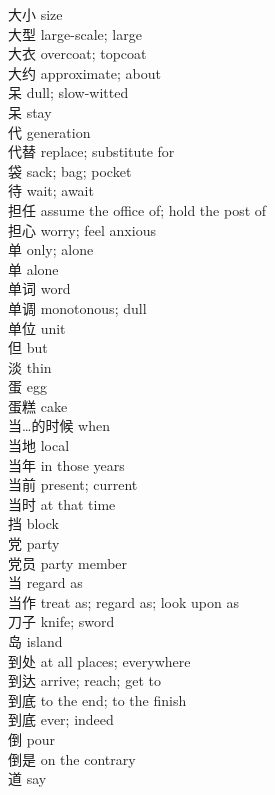 大小 \quad size\\
大型 \quad large-scale; large\\
大衣 \quad overcoat; topcoat\\
大约 \quad approximate; about\\
呆 \quad dull; slow-witted\\
呆 \quad stay\\
代 \quad generation\\
代替 \quad replace; substitute for\\
袋 \quad sack; bag; pocket\\
待 \quad wait; await\\
担任 \quad assume the office of; hold the post of\\
担心 \quad worry; feel anxious\\
单 \quad only; alone\\
单 \quad alone\\
单词 \quad word\\
单调 \quad monotonous; dull\\
单位 \quad unit\\
但 \quad but\\
淡 \quad thin\\
蛋 \quad egg\\
蛋糕 \quad cake\\
当…的时候 \quad when\\
当地 \quad local\\
当年 \quad in those years\\
当前 \quad present; current\\
当时 \quad at that time\\
挡 \quad block\\
党 \quad party\\
党员 \quad party member\\
当 \quad regard as\\
当作 \quad treat as; regard as; look upon as\\
刀子 \quad knife; sword\\
岛 \quad island\\
到处 \quad at all places; everywhere\\
到达 \quad arrive; reach; get to\\
到底 \quad to the end; to the finish\\
到底 \quad ever; indeed\\
倒 \quad pour\\
倒是 \quad on the contrary\\
道 \quad say\\
